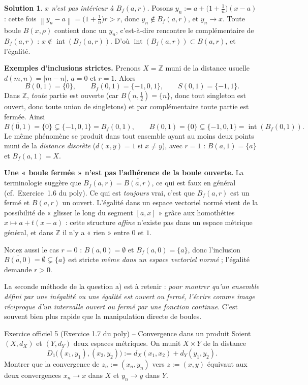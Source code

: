 \documentclass[11pt,a4paper]{article}
\newcommand{\Z}{\mathbb{Z}}
\newcommand{\adh}[1]{\overline{#1}}
\newcommand{\Int}{\operatorname{int}}
\newcommand{\Bf}{B_f}
\newcommand{\norm}[1]{\left\|#1\right\|}
\newcommand{\ie}{c'est-à-dire}
\theoremstyle{definition}
\newtheorem*{solution}{Solution}
\begin{document}
\begin{solution}
\emph{$x$ n'est pas intérieur à $\Bf(a,r)$.} Posons $y_n := a+\big(1+\tfrac1n\big)(x-a)$ : cette fois $\norm{y_n-a}=\big(1+\tfrac1n\big)r>r$, donc $y_n\notin\Bf(a,r)$, et $y_n\to x$. Toute boule $B(x,\rho)$ contient donc un $y_n$, \ie{} rencontre le complémentaire de $\Bf(a,r)$ : $x\notin\Int(\Bf(a,r))$. D'où $\Int(\Bf(a,r))\subset B(a,r)$, et l'égalité.

\medskip
\noindent\textbf{Exemples d'inclusions strictes.} Prenons $X=\Z$ muni de la distance usuelle $d(m,n)=|m-n|$, $a=0$ et $r=1$. Alors
\[
B(0,1)=\{0\},\qquad \Bf(0,1)=\{-1,0,1\},\qquad S(0,1)=\{-1,1\}.
\]
Dans $\Z$, \emph{toute} partie est ouverte (car $B(n,\tfrac12)=\{n\}$, donc tout singleton est ouvert, donc toute union de singletons) et par complémentaire toute partie est fermée. Ainsi
\[
\adh{B(0,1)}=\{0\}\subsetneq\{-1,0,1\}=\Bf(0,1),
\qquad
B(0,1)=\{0\}\subsetneq\{-1,0,1\}=\Int(\Bf(0,1)).
\]
Le même phénomène se produit dans tout ensemble ayant au moins deux points muni de la \emph{distance discrète} ($d(x,y)=1$ si $x\ne y$), avec $r=1$ : $B(a,1)=\{a\}$ et $\Bf(a,1)=X$.
\end{solution}

\begin{piege}
\textbf{Une « boule fermée » n'est pas l'adhérence de la boule ouverte.} La terminologie suggère que $\Bf(a,r)=\adh{B(a,r)}$, ce qui est faux en général (cf.\ Exercice~1.6 du poly). Ce qui est \emph{toujours} vrai, c'est que $\Bf(a,r)$ est un fermé et $B(a,r)$ un ouvert. L'égalité dans un espace vectoriel normé vient de la possibilité de « glisser le long du segment $[a,x]$ » grâce aux homothéties $x\mapsto a+t(x-a)$ : cette structure \emph{affine} n'existe pas dans un espace métrique général, et dans $\Z$ il n'y a « rien » entre $0$ et $1$.

Notez aussi le cas $r=0$ : $B(a,0)=\emptyset$ et $\Bf(a,0)=\{a\}$, donc l'inclusion $\adh{B(a,0)}=\emptyset\subsetneq\{a\}$ est stricte \emph{même dans un espace vectoriel normé} ; l'égalité demande $r>0$.
\end{piege}

\begin{pointcle}
La seconde méthode de la question a) est à retenir : \emph{pour montrer qu'un ensemble défini par une inégalité ou une égalité est ouvert ou fermé, l'écrire comme image réciproque d'un intervalle ouvert ou fermé par une fonction continue}. C'est souvent bien plus rapide que la manipulation directe de boules.
\end{pointcle}

\begin{exo}{Exercice officiel 5 (Exercice 1.7 du poly) -- Convergence dans un produit}
Soient $(X,d_X)$ et $(Y,d_Y)$ deux espaces métriques. On munit $X\times Y$ de la distance
\[
D_1\big((x_1,y_1),(x_2,y_2)\big):=d_X(x_1,x_2)+d_Y(y_1,y_2).
\]
Montrer que la convergence de $z_n:=(x_n,y_n)$ vers $z:=(x,y)$ équivaut aux deux convergences $x_n\to x$ dans $X$ et $y_n\to y$ dans $Y$.
\end{exo}
\end{document}
